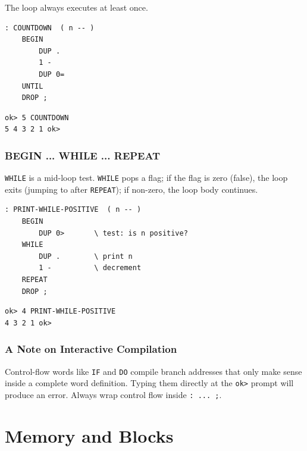 The loop always executes at least once.

\begin{lstlisting}[language=Forth]
: COUNTDOWN  ( n -- )
    BEGIN
        DUP .
        1 -
        DUP 0=
    UNTIL
    DROP ;
\end{lstlisting}

\begin{lstlisting}[language=Forth]
ok> 5 COUNTDOWN
5 4 3 2 1 ok>
\end{lstlisting}

\section{BEGIN ... WHILE ... REPEAT}
\label{sec:begin-while-repeat}

\texttt{WHILE} is a mid-loop test. \texttt{WHILE} pops a flag; if the flag is
zero (false), the loop exits (jumping to after \texttt{REPEAT}); if non-zero,
the loop body continues.

\begin{lstlisting}[language=Forth]
: PRINT-WHILE-POSITIVE  ( n -- )
    BEGIN
        DUP 0>       \ test: is n positive?
    WHILE
        DUP .        \ print n
        1 -          \ decrement
    REPEAT
    DROP ;
\end{lstlisting}

\begin{lstlisting}[language=Forth]
ok> 4 PRINT-WHILE-POSITIVE
4 3 2 1 ok>
\end{lstlisting}

\section{A Note on Interactive Compilation}
\label{sec:note-interactive-compile}

Control-flow words like \texttt{IF} and \texttt{DO} compile branch addresses
that only make sense inside a complete word definition. Typing them directly
at the \texttt{ok>} prompt will produce an error. Always wrap control flow
inside \texttt{: ... ;}.

\part{Memory and Blocks}

